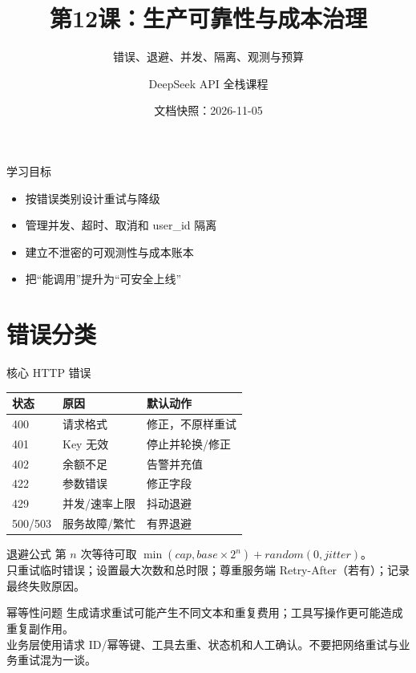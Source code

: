 \documentclass[aspectratio=169,UTF8]{ctexbeamer}
\title{第12课：生产可靠性与成本治理}
\subtitle{错误、退避、并发、隔离、观测与预算}
\author{DeepSeek API 全栈课程}
\date{文档快照：2026-11-05}
\begin{document}
\frame{\titlepage}
\begin{frame}{学习目标}
\begin{itemize}
  \item 按错误类别设计重试与降级
  \item 管理并发、超时、取消和 user\_id 隔离
  \item 建立不泄密的可观测性与成本账本
  \item 把“能调用”提升为“可安全上线”
\end{itemize}
\end{frame}
\section{错误分类}
\begin{frame}{核心 HTTP 错误}
\small
\begin{tabular}{lll}
\toprule
状态 & 原因 & 默认动作\\
\midrule
400 & 请求格式 & 修正，不原样重试\\
401 & Key 无效 & 停止并轮换/修正\\
402 & 余额不足 & 告警并充值\\
422 & 参数错误 & 修正字段\\
429 & 并发/速率上限 & 抖动退避\\
500/503 & 服务故障/繁忙 & 有界退避\\
\bottomrule
\end{tabular}
\end{frame}
\begin{frame}{退避公式}
第 $n$ 次等待可取 $\min(cap, base\times2^n)+random(0,jitter)$。\\[8pt]
只重试临时错误；设置最大次数和总时限；尊重服务端 Retry-After（若有）；记录最终失败原因。
\end{frame}
\begin{frame}{幂等性问题}
生成请求重试可能产生不同文本和重复费用；工具写操作更可能造成重复副作用。\\[8pt]
业务层使用请求 ID/幂等键、工具去重、状态机和人工确认。不要把网络重试与业务重试混为一谈。
\end{frame}
\end{document}
